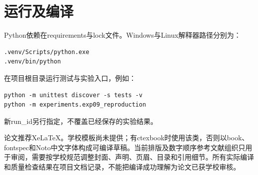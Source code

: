 \section{运行及编译}
Python依赖在requirements与lock文件。Windows与Linux解释器路径分别为：
\begin{verbatim}
.venv/Scripts/python.exe
.venv/bin/python
\end{verbatim}
在项目根目录运行测试与实验入口，例如：
\begin{verbatim}
python -m unittest discover -s tests -v
python -m experiments.exp09_reproduction
\end{verbatim}
新run\_id另行指定，不覆盖已经保存的实验结果。

论文推荐XeLaTeX。学校模板尚未提供；有ctexbook时使用该类，否则以book、fontspec和Noto中文字体构成可编译草稿。当前排版及数字顺序参考文献组织只用于审阅，需要按学校规范调整封面、声明、页眉、目录和引用细节。所有实际编译和质量检查结果在项目文档记录，不能把编译成功理解为论文已获学校审核。
